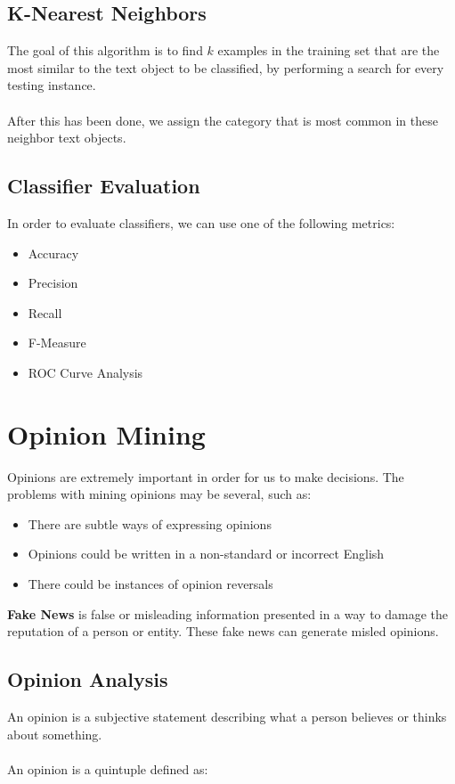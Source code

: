 \documentclass{article}
\begin{document}
\subsection{K-Nearest Neighbors}
The goal of this algorithm is to find $k$ examples in the training set that are the most similar to the text object to be classified, by performing a search for every testing instance. \\ \\
After this has been done, we assign the category that is most common in these neighbor text objects.

\subsection{Classifier Evaluation}
In order to evaluate classifiers, we can use one of the following metrics:

\begin{itemize}
	\item Accuracy
	\item Precision
	\item Recall
	\item F-Measure
	\item ROC Curve Analysis
\end{itemize}

\section{Opinion Mining}
Opinions are extremely important in order for us to make decisions. The problems with mining opinions may be several, such as:

\begin{itemize}
	\item There are subtle ways of expressing opinions
	\item Opinions could be written in a non-standard or incorrect English
	\item There could be instances of opinion reversals
\end{itemize}
\textbf{Fake News} is false or misleading information presented in a way to damage the reputation of a person or entity. These fake news can generate misled opinions.

\subsection{Opinion Analysis}
An opinion is a subjective statement describing what a person believes or thinks about something. \\ \\
An opinion is a quintuple defined as:
\end{document}
